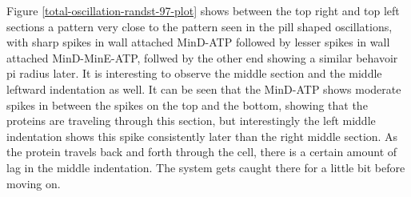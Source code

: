 \documentclass[letterpaper,twocolumn,amsmath,amssymb,pre]{revtex4-1}
\begin{document}
Figure \ref{total-oscillation-randst-97-plot} shows between the top
right and top left sections a pattern very close to the pattern seen
in the pill shaped oscillations, with sharp spikes in wall attached
MinD-ATP followed by lesser spikes in wall attached MinD-MinE-ATP,
follwed by the other end showing a similar behavoir pi radius later.
It is interesting to observe the middle section and the middle
leftward indentation as well.  It can be seen that the MinD-ATP shows
moderate spikes in between the spikes on the top and the bottom,
showing that the proteins are traveling through this section, but
interestingly the left middle indentation shows this spike
consistently later than the right middle section. As the protein
travels back and forth through the cell, there is a certain amount of
lag in the middle indentation.  The system gets caught there for a
little bit before moving on.
\end{document}
